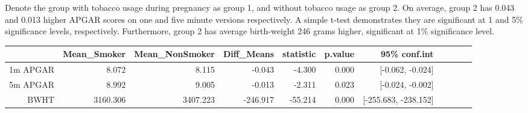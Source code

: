 \documentclass[12pt]{article}
\begin{document}
\vem
{}






\newpage

Denote the group with tobacco usage during pregnancy as group 1, and without tobacco usage as group 2. On average, group 2 has 0.043 and 0.013 higher APGAR scores on one and five minute versions respectively. A simple t-test demonstrates they are significant at 1 and 5\% significance levels, respectively. Furthermore, group 2 has average birth-weight 246 grams higher, significant at 1\% significance level.

\begin{table}[ht]
\centering
\begin{tabular}{rrrrrrrrrll}
  \hline
 & Mean\_Smoker & Mean\_NonSmoker & Diff\_Means & statistic & p.value & 95\% conf.int \\ 
  \hline
1m APGAR & 8.072 & 8.115 & -0.043 & -4.300 & 0.000 & [-0.062, -0.024] \\ 
5m APGAR & 8.992 & 9.005 & -0.013 & -2.311 & 0.023 & [-0.024, -0.002] \\ 
BWHT & 3160.306 & 3407.223 & -246.917 & -55.214 & 0.000 & [-255.683, -238.152] \\ 
   \hline
\end{tabular}
\end{table}
\end{document}
